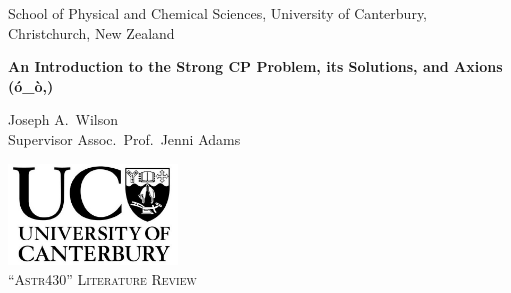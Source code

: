 
\begin{titlepage}


\begin{center} \linespread{0.9}
\Large School of Physical and Chemical Sciences, University of Canterbury, Christchurch, New Zealand
\end{center}

\vspace{3cm}

\begin{center}
\huge\bf
An Introduction to the Strong CP Problem, its Solutions, and Axions (ó\_ò,)
\end{center}


\begin{center} \linespread{1.5}
	\Large
	Joseph A.\ Wilson
\\	Supervisor Assoc.\ Prof.\ Jenni Adams
\end{center}

\iftrue
\vspace{3cm}
\centerline{}
\fi

\vfill

\begin{center} \linespread{1.5}
\includegraphics[width=45mm]{resources/UC.png} \\
\vspace{1ex}
\Large \textsc{``Astr430'' Literature Review} \\
\end{center}
\vspace{4pt}

\vspace{2cm}

\end{titlepage}

\restoregeometry
